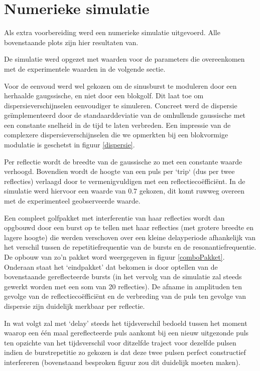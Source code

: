 \section{Numerieke simulatie}
Als extra voorbereiding werd een numerieke simulatie uitgevoerd. Alle 
bovenstaande plots zijn hier resultaten van.

De simulatie werd opgezet met waarden voor de parameters die overeenkomen 
met de experimentele waarden in de volgende sectie.

Voor de eenvoud werd wel gekozen om de sinusburst te moduleren door een 
herhaalde gaugssische, en niet door een blokgolf. Dit laat toe om 
dispersieverschijnselen eenvoudiger te simuleren. Concreet werd de 
dispersie ge\"implementeerd door de standaarddeviatie van de omhullende 
gaussische met een constante snelheid in de tijd te laten verbreden. Een 
impressie van de complexere dispersieverschijnselen die we opmerkten bij 
een blokvormige modulatie is geschetst in figuur \ref{dispersie}.

Per reflectie wordt de breedte van de gaussische zo met een constante 
waarde verhoogd. Bovendien wordt de hoogte van een puls per `trip` (dus per 
twee reflecties) verlaagd door te vermenigvuldigen met een 
reflectieco\"effici\"ent. In de simulatie werd hiervoor een waarde van 
$0.7$ gekozen, dit komt ruwweg overeen met de experimenteel geobserveerde 
waarde.

Een compleet golfpakket met interferentie van haar reflecties wordt dan 
opgbouwd door een burst op te tellen met haar reflecties (met grotere 
breedte en lagere hoogte) die werden verschoven over een kleine 
delayperiode afhankelijk van het verschil tussen de repetitiefrequentie van 
de bursts en de resonantiefrequentie. De opbouw van zo'n pakket word 
weergegeven in figuur \ref{comboPakket}. Onderaan staat het `eindpakket' 
dat bekomen is door optellen van de bovenstaande gereflecteerde bursts (in 
het vervolg van de simulatie zal steeds gewerkt worden met een som van 20 
reflecties). De afname in amplituden ten gevolge van de 
reflectieco\"effici\"ent en de verbreding van de puls ten gevolge van 
dispersie zijn duidelijk merkbaar per reflectie.


In wat volgt zal met `delay' steeds het tijdsverschil bedoeld tussen het 
moment waarop een \'e\'en maal gereflecteerde puls aankomt bij een nieuw 
uitgezonde puls ten opzichte van het tijdsverschil voor ditzelfde traject 
voor dezelfde pulsen indien de burstrepetitie zo gekozen is dat deze twee 
pulsen perfect constructief interfereren (bovenstaand besproken figuur zou 
dit duidelijk moeten maken).

